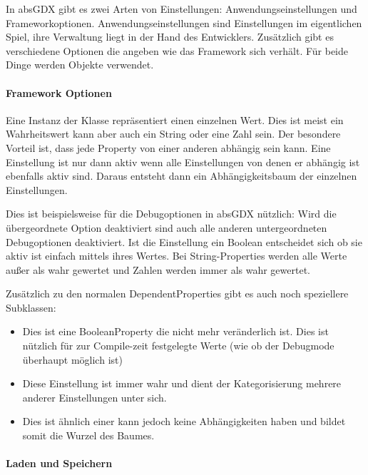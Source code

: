 
In absGDX gibt es zwei Arten von Einstellungen: Anwendungseinstellungen und Frameworkoptionen.
Anwendungseinstellungen sind Einstellungen im eigentlichen Spiel, ihre Verwaltung liegt in der Hand des Entwicklers.
Zusätzlich gibt es verschiedene Optionen die angeben wie das Framework sich verhält. Für beide Dinge werden  Objekte verwendet.

\paragraph{Framework Optionen}

Eine Instanz der Klasse  repräsentiert einen einzelnen Wert. Dies ist meist ein Wahrheitswert kann aber auch ein String oder eine Zahl sein.
Der besondere Vorteil ist, dass jede Property von einer anderen abhängig sein kann. Eine Einstellung ist nur dann aktiv wenn alle Einstellungen von denen er abhängig ist ebenfalls aktiv sind. Daraus entsteht dann ein Abhängigkeitsbaum der einzelnen Einstellungen.


Dies ist beispielsweise für die Debugoptionen in absGDX nützlich: Wird die übergeordnete Option  deaktiviert sind auch alle anderen untergeordneten Debugoptionen deaktiviert. 
Ist die Einstellung ein Boolean entscheidet sich ob sie aktiv ist einfach mittels ihres Wertes. 
Bei String-Properties werden alle Werte außer  als wahr gewertet und Zahlen werden immer als wahr gewertet.

Zusätzlich zu den normalen DependentProperties gibt es auch noch speziellere Subklassen:

\begin{itemize}
\item {} Dies ist eine BooleanProperty die nicht mehr veränderlich ist. Dies ist nützlich für zur Compile-zeit festgelegte Werte (wie ob der Debugmode überhaupt möglich ist)
\item {} Diese Einstellung ist immer wahr und dient der Kategorisierung mehrere anderer Einstellungen unter sich.
\item {} Dies ist ähnlich einer  kann jedoch keine Abhängigkeiten haben und bildet somit die Wurzel des Baumes.
\end{itemize}

\paragraph{Laden und Speichern}

